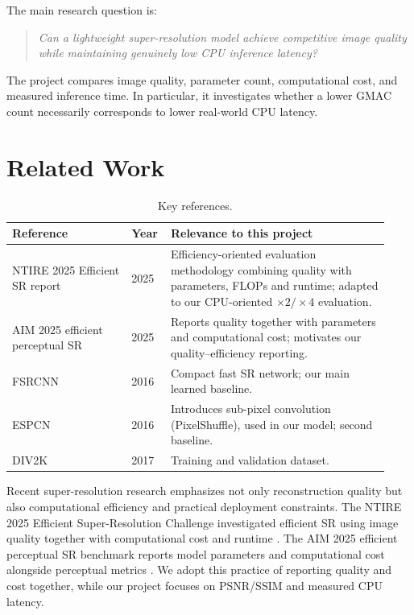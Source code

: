\documentclass[11pt,a4paper]{article}
\begin{document}
The main research question is:

\begin{quote}
\textit{Can a lightweight super-resolution model achieve competitive image
quality while maintaining genuinely low CPU inference latency?}
\end{quote}

The project compares image quality, parameter count, computational cost,
and measured inference time. In particular, it investigates whether a lower
GMAC count necessarily corresponds to lower real-world CPU latency.

\section{Related Work}
\label{sec:related}

\begin{table}[h]
\centering
\caption{Key references.}
\label{tab:refs}
\small
\begin{tabular}{@{}p{0.30\linewidth}p{0.08\linewidth}p{0.55\linewidth}@{}}
\toprule
\textbf{Reference} & \textbf{Year} & \textbf{Relevance to this project} \\
\midrule
NTIRE 2025 Efficient SR report \citep{ren2025ntire} & 2025 &
Efficiency-oriented evaluation methodology combining quality with
parameters, FLOPs and runtime; adapted to our CPU-oriented
$\times2/\times4$ evaluation. \\

AIM 2025 efficient perceptual SR \citep{aim2025} & 2025 &
Reports quality together with parameters and computational cost; motivates
our quality--efficiency reporting. \\


FSRCNN \citep{dong2016fsrcnn} & 2016 &
Compact fast SR network; our main learned baseline. \\

ESPCN \citep{shi2016espcn} & 2016 &
Introduces sub-pixel convolution (PixelShuffle), used in our model; second
baseline. \\

DIV2K \citep{agustsson2017div2k} & 2017 &
Training and validation dataset. \\
\bottomrule
\end{tabular}
\end{table}

Recent super-resolution research emphasizes not only reconstruction quality
but also computational efficiency and practical deployment constraints.
The NTIRE 2025 Efficient Super-Resolution Challenge investigated efficient
SR using image quality together with computational cost and runtime
\citep{ren2025ntire}. The AIM 2025 efficient perceptual SR benchmark
reports model parameters and computational cost alongside perceptual
metrics \citep{aim2025}. We adopt this practice of reporting quality and
cost together, while our project focuses on PSNR/SSIM and measured CPU
latency.
\end{document}
